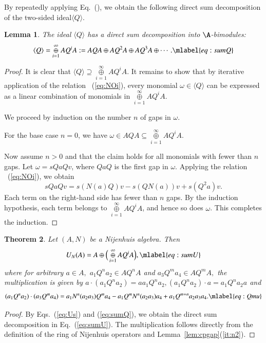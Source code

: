\documentclass[12pt]{amsart}
\newtheorem{theorem}{Theorem}[section]
\newtheorem{lemma}[theorem]{Lemma}
\theoremstyle{definition}
\begin{document}
By repeatedly applying Eq.~(), we obtain the following direct sum decomposition of the two-sided ideal$\langle Q\rangle$.  
\begin{lemma}  
The ideal
$\langle Q\rangle$ has a direct sum decomposition into $\A$-bimodules: \begin{equation}
\langle Q\rangle =\mathop{\oplus}\limits_{i=1}^\infty AQ^iA:= AQA\oplus AQ^2A\oplus AQ^3A\oplus\cdots. 
\mlabel{eq:sumQ}
\end{equation} 
\end{lemma}
%
\begin{proof} 
It is clear that $\langle Q\rangle \supseteq \mathop{\oplus}\limits_{i=1}^\infty AQ^iA$. It remains to show that by iterative application of the relation ~(\ref{eq:NOi}), every monomial $\omega \in \langle Q\rangle$ can be expressed as a linear combination of monomials in $\mathop{\oplus}\limits_{i=1}^\infty AQ^i A$.

We proceed by induction on the number $n$ of  gaps in $\omega$.

For the base case $n = 0$, we have $\omega \in AQA \subseteq \mathop{\oplus}\limits_{i=1}^\infty AQ^iA$.

Now assume $n > 0$ and that the claim holds for all monomials with fewer than $n$  gaps. Let $\omega = sQaQv$, where $QaQ$ is the first  gap in $\omega$. Applying the relation ~(\ref{eq:NOi}), we obtain 
$$sQaQv=s(N(a)Q)v-s(QN(a))v+s(Q^2a)v.$$
Each term on the right-hand side has fewer than $n$  gaps. By the induction hypothesis, each term belongs to $\mathop{\oplus}\limits_{i=1}^\infty AQ^iA$, and hence so does $\omega$. This completes the induction. 
\end{proof}

\begin{theorem} 
Let $(A,N)$ be a Nijenhuis algebra. Then  \begin{equation}
U_N(A)= A\oplus\Big(\mathop{\oplus}\limits_{i=1}^\infty AQ^iA \Big),
\mlabel{eq:sumU}
\end{equation} 
where for arbitrary $a\in A,$ $a_1Q^na_2\in AQ^nA$ and $a_3Q^ma_4\in AQ^mA,$  the multiplication is given by $a\cdot(a_1Q^na_2)=aa_1Q^na_2, (a_1Q^na_2)\cdot a=a_1Q^n a_2a$ and
\begin{equation}
(a_1Q^na_2)\cdot (a_3Q^ma_4)= 
a_1 N^n(a_2 a_3)Q^{m}a_4- a_1Q^{m}N^n(a_2 a_3)a_4 +a_1Q^{m+n } a_2 a_3a_4.
\mlabel{eq:Qmu}
\end{equation} 
\end{theorem}
%
\begin{proof}
By Eqs.~(\ref{eq:Us}) and (\ref{eq:sumQ}), we obtain the direct sum decomposition in Eq.~(\ref{eq:sumU}).
The multiplication  follows directly from the definition of the ring of Nijenhuis operators and Lemma~\ref{lem:cpgap}(\ref{it:n2}).    
\end{proof}
\end{document}
